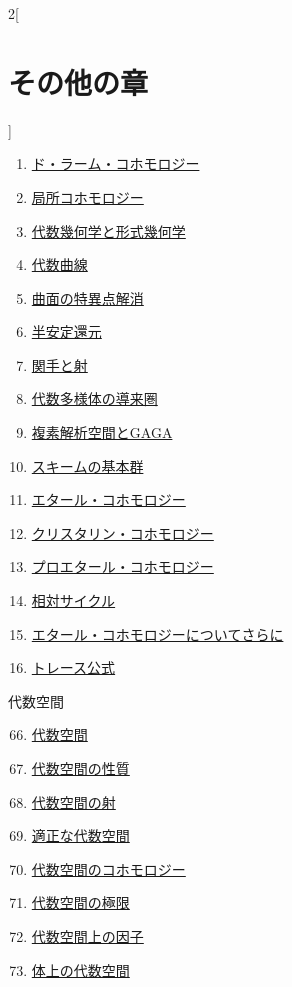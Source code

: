 \begin{multicols}{2}[\section{その他の章}]
\begin{enumerate}
\item \hyperref[derham-section-phantom]{ド・ラーム・コホモロジー}
\item \hyperref[local-cohomology-section-phantom]{局所コホモロジー}
\item \hyperref[algebraization-section-phantom]{代数幾何学と形式幾何学}
\item \hyperref[curves-section-phantom]{代数曲線}
\item \hyperref[resolve-section-phantom]{曲面の特異点解消}
\item \hyperref[models-section-phantom]{半安定還元}
\item \hyperref[functors-section-phantom]{関手と射}
\item \hyperref[equiv-section-phantom]{代数多様体の導来圏}
\item \hyperref[gaga-section-phantom]{複素解析空間とGAGA}
\item \hyperref[pione-section-phantom]{スキームの基本群}
\item \hyperref[etale-cohomology-section-phantom]{エタール・コホモロジー}
\item \hyperref[crystalline-section-phantom]{クリスタリン・コホモロジー}
\item \hyperref[proetale-section-phantom]{プロエタール・コホモロジー}
\item \hyperref[relative-cycles-section-phantom]{相対サイクル}
\item \hyperref[more-etale-section-phantom]{エタール・コホモロジーについてさらに}
\item \hyperref[trace-section-phantom]{トレース公式}
\end{enumerate}
代数空間
\begin{enumerate}
\setcounter{enumi}{65}
\item \hyperref[spaces-section-phantom]{代数空間}
\item \hyperref[spaces-properties-section-phantom]{代数空間の性質}
\item \hyperref[spaces-morphisms-section-phantom]{代数空間の射}
\item \hyperref[decent-spaces-section-phantom]{適正な代数空間}
\item \hyperref[spaces-cohomology-section-phantom]{代数空間のコホモロジー}
\item \hyperref[spaces-limits-section-phantom]{代数空間の極限}
\item \hyperref[spaces-divisors-section-phantom]{代数空間上の因子}
\item \hyperref[spaces-over-fields-section-phantom]{体上の代数空間}

\end{enumerate}
\end{multicols}
